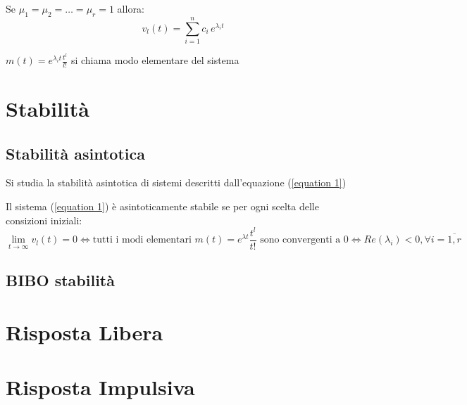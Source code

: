\begin{osservazione}
	Se $\mu_1 = \mu_2 = \dots = \mu_r = 1$ allora:
	\begin{equation*}
		v_l(t)=  \sum_{i=1}^{n}c_{i} \,e^{\lambda_it}
	\end{equation*}
\end{osservazione}

\begin{definizione}
	$m(t) = e^{\lambda_i t} \frac{t^l}{l!} $ si chiama modo elementare del sistema
\end{definizione}


\section{Stabilità}
\subsection{Stabilità asintotica}
Si studia la stabilità asintotica di sistemi descritti dall'equazione (\ref{equation 1})

\begin{theorem}
	Il sistema (\ref{equation 1}) è asintoticamente stabile se per ogni scelta delle consizioni iniziali:
	\begin{equation*}
		\lim_{t \to \infty}v_l(t)=0
		\Leftrightarrow\text{tutti i modi elementari } m(t)=e^{\lambda t}\frac{t^l}{t!}\text{ sono convergenti a $0$}
		\Leftrightarrow Re(\lambda_i)<0,\forall i = \overline{1,r}
	\end{equation*}
\end{theorem}


\subsection{BIBO stabilità}


\section{Risposta Libera}



\section{Risposta Impulsiva}

